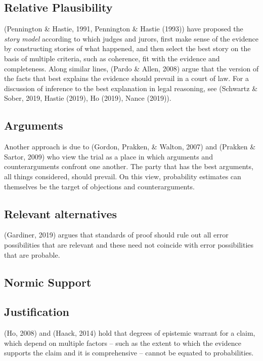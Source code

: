 \documentclass[10pt,dvipsnames]{scrartcl}
\begin{document}
\subsection{Relative Plausibility}\label{relative-plausibility}

(Pennington \& Hastie, 1991, Pennington \& Hastie (1993)) have proposed
the \textit{story model} according to which judges and jurors, first
make sense of the evidence by constructing stories of what happened, and
then select the best story on the basis of multiple criteria, such as
coherence, fit with the evidence and completeness. Along similar lines,
(Pardo \& Allen, 2008) argue that the version of the facts that best
explains the evidence should prevail in a court of law. For a discussion
of inference to the best explanation in legal reasoning, see (Schwartz
\& Sober, 2019, Hastie (2019), Ho (2019), Nance (2019)).

\subsection{Arguments}\label{arguments}

Another approach is due to (Gordon, Prakken, \& Walton, 2007) and
(Prakken \& Sartor, 2009) who view the trial as a place in which
arguments and counterarguments confront one another. The party that has
the best arguments, all things considered, should prevail. On this view,
probability estimates can themselves be the target of objections and
counterarguments.

\subsection{Relevant alternatives}\label{relevant-alternatives}

(Gardiner, 2019) argues that standards of proof should rule out all
error possibilities that are relevant and these need not coincide with
error possibilities that are probable.

\subsection{Normic Support}\label{normic-support}

\subsection{Justification}\label{justification}

(Ho, 2008) and (Haack, 2014) hold that degrees of epistemic warrant for
a claim, which depend on multiple factors -- such as the extent to which
the evidence supports the claim and it is comprehensive -- cannot be
equated to probabilities.
\end{document}
